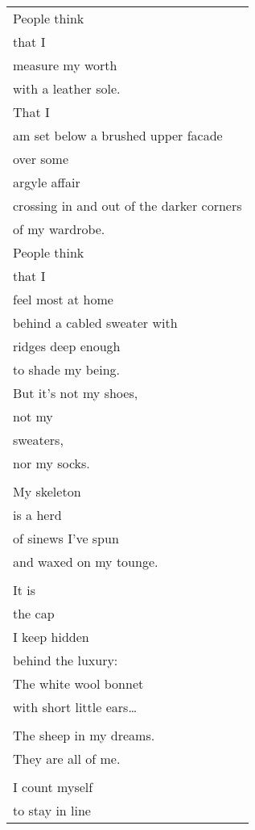 \documentclass{article}
\begin{document}
\begin{center}
\begin{tabular}{l}
People think \\
that I \\
measure my worth \\
with a leather sole. \\
That I \\
am set below a brushed upper facade \\
over some \\
argyle affair \\
crossing in and out of the darker corners \\
of my wardrobe. \\
People think \\
that I \\
feel most at home \\
behind a cabled sweater with \\
ridges deep enough \\
to shade my being. \\
But it's not my shoes, \\
not my \\
sweaters, \\
nor my socks. \\
\\
My skeleton \\
is a herd \\
of sinews I've spun \\
and waxed on my tounge. \\
\\
It is \\
the cap \\
I keep hidden \\
behind the luxury: \\
The white wool bonnet \\
with short little ears\ldots{} \\
\\
The sheep in my dreams. \\
They are all of me. \\
\\
I count myself \\
to stay in line \\

\end{tabular}
\end{center}
\end{document}

